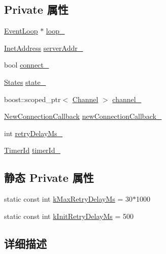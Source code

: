 \subsection*{Private 属性}
\begin{DoxyCompactItemize}
\item 
\hyperlink{classmuduo_1_1EventLoop}{Event\+Loop} $\ast$ \hyperlink{classmuduo_1_1Connector_a19968f50018d32ac31f5cba0195591ac}{loop\+\_\+}
\item 
\hyperlink{classmuduo_1_1InetAddress}{Inet\+Address} \hyperlink{classmuduo_1_1Connector_a70de848a60434ed7c6f33ba257fdbbfe}{server\+Addr\+\_\+}
\item 
bool \hyperlink{classmuduo_1_1Connector_ab4b9ce5dfde7fe6c5954a376aac00190}{connect\+\_\+}
\item 
\hyperlink{classmuduo_1_1Connector_a808e5cd4979462d3bbe3070d7d147444}{States} \hyperlink{classmuduo_1_1Connector_a69e113af7e38a28d7e9cbcd1dc0836e3}{state\+\_\+}
\item 
boost\+::scoped\+\_\+ptr$<$ \hyperlink{classmuduo_1_1Channel}{Channel} $>$ \hyperlink{classmuduo_1_1Connector_a8375a127884b4155e4d0ff8604bb0b9a}{channel\+\_\+}
\item 
\hyperlink{classmuduo_1_1Connector_a74d0c9e28e41cb2b3310e0c1d3671710}{New\+Connection\+Callback} \hyperlink{classmuduo_1_1Connector_a315d8356d0420fe5a89dc67f49c82617}{new\+Connection\+Callback\+\_\+}
\item 
int \hyperlink{classmuduo_1_1Connector_a22e73d8243605061d5201effe673e2bc}{retry\+Delay\+Ms\+\_\+}
\item 
\hyperlink{classmuduo_1_1TimerId}{Timer\+Id} \hyperlink{classmuduo_1_1Connector_a6e461b999972c0c7798da0070b41d931}{timer\+Id\+\_\+}
\end{DoxyCompactItemize}
\subsection*{静态 Private 属性}
\begin{DoxyCompactItemize}
\item 
static const int \hyperlink{classmuduo_1_1Connector_a4238c23fd75230d429c3273ef4a91bef}{k\+Max\+Retry\+Delay\+Ms} = 30$\ast$1000
\item 
static const int \hyperlink{classmuduo_1_1Connector_abaa28ed649f43db991c045b039984aa2}{k\+Init\+Retry\+Delay\+Ms} = 500
\end{DoxyCompactItemize}


\subsection{详细描述}


